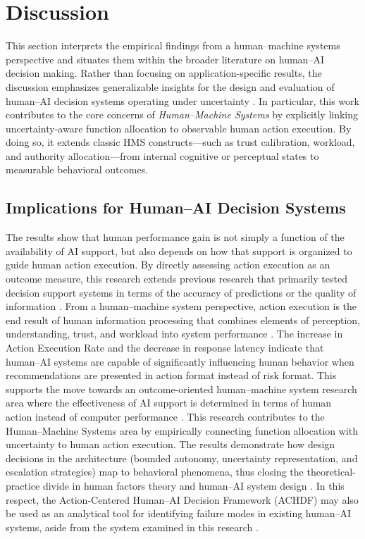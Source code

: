 \documentclass[journal]{IEEEtran}
\theoremstyle{plain}
\theoremstyle{definition}
\begin{document}
\section{Discussion}
This section interprets the empirical findings from a human--machine systems perspective and situates them within the broader literature on human--AI decision making. Rather than focusing on application-specific results, the discussion emphasizes generalizable insights for the design and evaluation of human--AI decision systems operating under uncertainty \cite{Bach2024Access,PerezCerrolaza2024CSUR,Lai2023FAccT,Yang2022THMSReview}. 
In particular, this work contributes to the core concerns of \textit{Human--Machine Systems} by explicitly linking uncertainty-aware function allocation to observable human action execution. By doing so, it extends classic HMS constructs---such as trust calibration, workload, and authority allocation---from internal cognitive or perceptual states to measurable behavioral outcomes.

\subsection{Implications for Human--AI Decision Systems}
The results show that human performance gain is not simply a function of the availability of AI support, but also depends on how that support is organized to guide human action execution. By directly assessing action execution as an outcome measure, this research extends previous research that primarily tested decision support systems in terms of the accuracy of predictions or the quality of information \cite{Lai2023FAccT,Muller2022CHIWORK,Yang2022THMSReview}.
From a human--machine system perspective, action execution is the end result of human information processing that combines elements of perception, understanding, trust, and workload into system performance \cite{Hodgson2013THMS,Bach2024Access}.
The increase in Action Execution Rate and the decrease in response latency indicate that human--AI systems are capable of significantly influencing human behavior when recommendations are presented in action format instead of risk format. This supports the move towards an outcome-oriented human--machine system research area where the effectiveness of AI support is determined in terms of human action instead of computer performance \cite{Lai2023FAccT,Yang2022THMSReview}.
This research contributes to the Human--Machine Systems area by empirically connecting function allocation with uncertainty to human action execution. The results demonstrate how design decisions in the architecture (bounded autonomy, uncertainty representation, and escalation strategies) map to behavioral phenomena, thus closing the theoretical-practice divide in human factors theory and human--AI system design \cite{Bach2024Access,Assaad2023TAS,Zhang2022THMS}.
In this respect, the Action-Centered Human--AI Decision Framework (ACHDF) may also be used as an analytical tool for identifying failure modes in existing human--AI systems, aside from the system examined in this research \cite{Yang2022THMSReview,Lai2023FAccT}.
\end{document}
